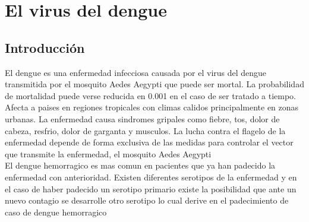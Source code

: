 
\section{El virus del dengue}

\subsection{Introducción}
El dengue es una enfermedad infecciosa causada por el virus del dengue transmitida por el mosquito Aedes Aegypti que puede ser mortal. La probabilidad de mortalidad puede verse reducida en 0.001 en el caso de ser tratado a tiempo.\\

Afecta a paises en regiones tropicales con climas calidos principalmente en zonas urbanas. La enfermedad causa sindromes gripales como fiebre, tos, dolor de cabeza, resfrio, dolor de garganta y musculos. La lucha contra el flagelo de la enfermedad depende de forma exclusiva de las medidas para controlar el vector que transmite la enfermedad, el mosquito Aedes Aegypti\\

El dengue hemorragico es mas comun en pacientes que ya han padecido la enfermedad con anterioridad. Existen diferentes serotipos de la enfermedad y en el caso de haber padecido un serotipo primario existe la posibilidad que ante un nuevo contagio se desarrolle otro serotipo lo cual derive en el padecimiento de caso de dengue hemorragico
